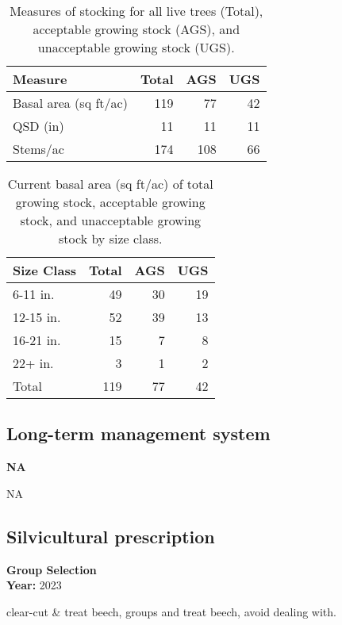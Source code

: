 \documentclass[]{tufte-handout}
\begin{document}
\begin{table}

\caption{\label{tab:unnamed-chunk-6}Measures of stocking for all live trees (Total), acceptable growing stock (AGS), and unacceptable growing stock (UGS).}
\centering
\begin{tabular}[t]{lrrr}
\toprule
Measure & Total & AGS & UGS\\
\midrule
Basal area (sq ft/ac) & 119 & 77 & 42\\
QSD (in) & 11 & 11 & 11\\
Stems/ac & 174 & 108 & 66\\
\bottomrule
\end{tabular}
\end{table}

\begin{table}

\caption{\label{tab:unnamed-chunk-7}Current basal area (sq ft/ac) of total growing stock, acceptable growing stock, and unacceptable growing stock by size class.}
\centering
\begin{tabular}[t]{lrrr}
\toprule
Size Class & Total & AGS & UGS\\
\midrule
6-11 in. & 49 & 30 & 19\\
12-15 in. & 52 & 39 & 13\\
16-21 in. & 15 & 7 & 8\\
22+ in. & 3 & 1 & 2\\
Total & 119 & 77 & 42\\
\bottomrule
\end{tabular}
\end{table}

\subsection{Long-term management
system}\label{long-term-management-system}

\textbf{NA}

NA

\subsection{Silvicultural
prescription}\label{silvicultural-prescription}

\textbf{Group Selection}\\
\noindent \textbf{Year:} 2023

clear-cut \& treat beech, groups and treat beech, avoid dealing with.

\newpage
\end{document}
